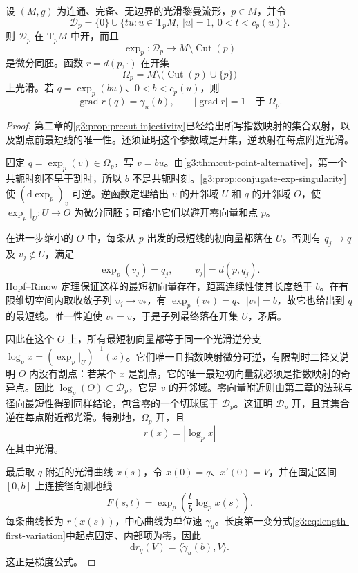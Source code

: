 \begin{proposition}\label{g3:prop:distance-smooth-regular}
	设 \((M,g)\) 为连通、完备、无边界的光滑黎曼流形，\(p\in M\)，并令
	\[
		\mathcal D_p=\{0\}\cup
		\{tu:u\in\mathrm T_pM,\ |u|=1,\ 0<t<c_p(u)\}.
	\]
	则 \(\mathcal D_p\) 在 \(\mathrm T_pM\) 中开，而且
	\[
		\exp_p:\mathcal D_p\longrightarrow M\setminus\operatorname{Cut}(p)
	\]
	是微分同胚。函数 \(r=d(p,\cdot)\) 在开集
	\[
		\Omega_p=M\setminus\bigl(\operatorname{Cut}(p)\cup\{p\}\bigr)
	\]
	上光滑。若 \(q=\exp_p(bu)\)、\(0<b<c_p(u)\)，则
	\begin{equation}\label{g3:eq:distance-gradient}
		\operatorname{grad}r(q)=\dot\gamma_u(b),
		\qquad |\operatorname{grad}r|=1
		\quad\text{于 }\Omega_p.
	\end{equation}
\end{proposition}
\begin{proof}
	第二章的\cref{g3:prop:precut-injectivity}已经给出所写指数映射的集合双射，以及割点前最短线的唯一性。还须证明这个参数域是开集，逆映射在每点附近光滑。

	固定 \(q=\exp_p(v)\in\Omega_p\)，写 \(v=bu\)。由\cref{g3:thm:cut-point-alternative}，第一个共轭时刻不早于割时，所以 \(b\) 不是共轭时刻。\cref{g3:prop:conjugate-exp-singularity}使 \((\mathrm d\exp_p)_v\) 可逆。逆函数定理给出 \(v\) 的开邻域 \(U\) 和 \(q\) 的开邻域 \(O\)，使 \(\exp_p|_U:U\to O\) 为微分同胚；可缩小它们以避开零向量和点 \(p\)。

	在进一步缩小的 \(O\) 中，每条从 \(p\) 出发的最短线的初向量都落在 \(U\)。否则有 \(q_j\to q\) 及 \(v_j\notin U\)，满足
	\[
		\exp_p(v_j)=q_j,\qquad |v_j|=d(p,q_j).
	\]
	Hopf--Rinow 定理保证这样的最短初向量存在，距离连续性使其长度趋于 \(b\)。在有限维切空间内取收敛子列 \(v_j\to v_*\)，有
	\(\exp_p(v_*)=q\)、\(|v_*|=b\)，故它也给出到 \(q\) 的最短线。唯一性迫使 \(v_*=v\)，于是子列最终落在开集 \(U\)，矛盾。

	因此在这个 \(O\) 上，所有最短初向量都等于同一个光滑逆分支 \(\log_p x=(\exp_p|_U)^{-1}(x)\)。它们唯一且指数映射微分可逆，有限割时二择又说明 \(O\) 内没有割点：若某个 \(x\) 是割点，它的唯一最短初向量就必须是指数映射的奇异点。因此 \(\log_p(O)\subset\mathcal D_p\)，它是 \(v\) 的开邻域。零向量附近则由第二章的法球与径向最短性得到同样结论，包含零的一个切球属于 \(\mathcal D_p\)。这证明 \(\mathcal D_p\) 开，且其集合逆在每点附近都光滑。特别地，\(\Omega_p\) 开，且
	\[
		r(x)=|\log_p x|
	\]
	在其中光滑。

	最后取 \(q\) 附近的光滑曲线 \(x(s)\)，令 \(x(0)=q\)、\(x'(0)=V\)，并在固定区间 \([0,b]\) 上连接径向测地线
	\[
		F(s,t)=\exp_p\left(\frac t b\log_p x(s)\right).
	\]
	每条曲线长为 \(r(x(s))\)，中心曲线为单位速 \(\gamma_u\)。长度第一变分式\eqref{g3:eq:length-first-variation}中起点固定、内部项为零，因此
	\[
		\mathrm dr_q(V)=\langle\dot\gamma_u(b),V\rangle.
	\]
	这正是梯度公式。
\end{proof}

